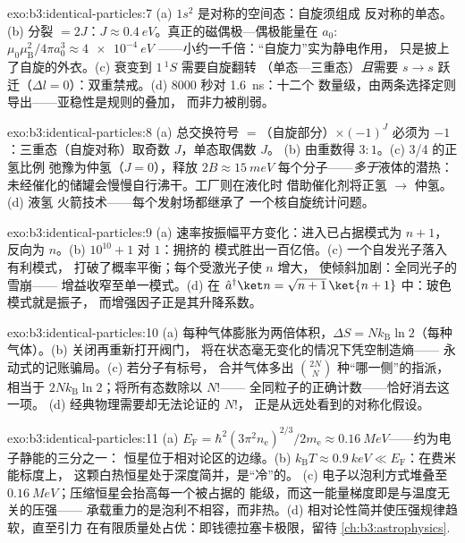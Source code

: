 \begin{solution}{exo:b3:identical-particles:7}
(a) $1s^2$ 是对称的空间态：自旋须组成
反对称的单态。(b) 分裂 $= 2J$：$J \approx
\qty{0.4}{eV}$。真正的磁偶极—偶极能量在
$a_0$: $\mu_0\mu_{\text{B}}^2/4\pi a_0^3 \approx \qty{4e-4}{eV}$
——小约一千倍：“自旋力”实为静电作用，
只是披上了自旋的外衣。(c) 衰变到 $1\,^1S$ 需要自旋翻转
（单态—三重态）\emph{且}需要 $s \to s$ 跃迁（$\Delta l =
0$）：双重禁戒。(d) $8000$ 秒对 \qty{1.6}{ns}：十二个
数量级，由两条选择定则导出——亚稳性是规则的叠加，
而非力被削弱。
\end{solution}

\begin{solution}{exo:b3:identical-particles:8}
(a) 总交换符号 $=$（自旋部分）$\times (-1)^J$ 必须为
$-1$：三重态（自旋对称）取奇数 $J$，单态取偶数 $J$。
(b) 由重数得 $3:1$。(c) 3/4 的正氢比例
弛豫为仲氢（$J = 0$），释放 $2B \approx \qty{15}{meV}$
每个分子——\emph{多于}液体的潜热：
未经催化的储罐会慢慢自行沸干。工厂则在液化时
借助催化剂将正氢 $\to$ 仲氢。(d) 液氢
火箭技术——每个发射场都继承了
一个核自旋统计问题。
\end{solution}

\begin{solution}{exo:b3:identical-particles:9}
(a) 速率按振幅平方变化：进入已占据模式为 $n + 1$，
反向为 $n$。(b) $10^{10} + 1$ 对 $1$：拥挤的
模式胜出一百亿倍。(c) 一个自发光子落入有利模式，
打破了概率平衡；每个受激光子使 $n$ 增大，
使倾斜加剧：全同光子的雪崩——
增益收窄至单一模式。(d) 在 $\hat a^\dagger\ket n =
\sqrt{n+1}\,\ket{n+1}$ 中：玻色模式就是振子，
而增强因子正是其升降系数。
\end{solution}

\begin{solution}{exo:b3:identical-particles:10}
(a) 每种气体膨胀为两倍体积，$\Delta S =
Nk_{\text{B}}\ln2$（每种气体）。(b) 关闭再重新打开阀门，
将在状态毫无变化的情况下凭空制造熵——
永动式的记账骗局。(c) 若分子有标号，
合并气体多出 $\binom{2N}{N}$ 种“哪一侧”的指派，
相当于 $2Nk_{\text{B}}\ln2$；将所有态数除以 $N!$——
全同粒子的正确计数——恰好消去这一项。
(d) 经典物理需要却无法论证的 $N!$，
正是从远处看到的对称化假设。
\end{solution}

\begin{solution}{exo:b3:identical-particles:11}
(a) $E_{\text{F}} = \hbar^2(3\pi^2n_{\text{e}})^{2/3}/2m_{\text{e}}
\approx \qty{0.16}{MeV}$——约为电子静能的三分之一：
恒星位于相对论区的边缘。(b)
$k_{\text{B}}T \approx \qty{0.9}{keV} \ll E_{\text{F}}$：在费米能标度上，
这颗白热恒星处于深度简并，是“冷”的。
(c) 电子以泡利方式堆叠至
$\qty{0.16}{MeV}$；压缩恒星会抬高每一个被占据的
能级，而这一能量梯度即是与温度无关的压强——
承载重力的是泡利不相容，而非热。(d)
相对论性简并使压强规律趋软，直至引力
在有限质量处占优：即钱德拉塞卡极限，留待
\cref{ch:b3:astrophysics}.
\end{solution}


